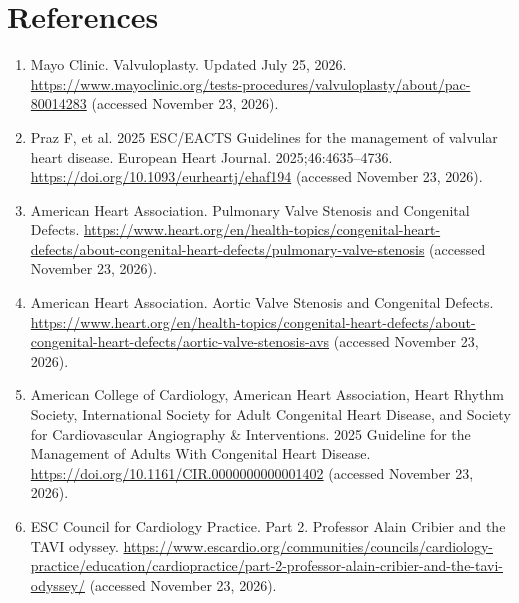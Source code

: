 \section*{References}
\begin{enumerate}
  \item Mayo Clinic. Valvuloplasty. Updated July 25, 2026. \url{https://www.mayoclinic.org/tests-procedures/valvuloplasty/about/pac-80014283} (accessed November 23, 2026).
  \item Praz F, et al. 2025 ESC/EACTS Guidelines for the management of valvular heart disease. European Heart Journal. 2025;46:4635--4736. \url{https://doi.org/10.1093/eurheartj/ehaf194} (accessed November 23, 2026).
  \item American Heart Association. Pulmonary Valve Stenosis and Congenital Defects. \url{https://www.heart.org/en/health-topics/congenital-heart-defects/about-congenital-heart-defects/pulmonary-valve-stenosis} (accessed November 23, 2026).
  \item American Heart Association. Aortic Valve Stenosis and Congenital Defects. \url{https://www.heart.org/en/health-topics/congenital-heart-defects/about-congenital-heart-defects/aortic-valve-stenosis-avs} (accessed November 23, 2026).
  \item American College of Cardiology, American Heart Association, Heart Rhythm Society, International Society for Adult Congenital Heart Disease, and Society for Cardiovascular Angiography \& Interventions. 2025 Guideline for the Management of Adults With Congenital Heart Disease. \url{https://doi.org/10.1161/CIR.0000000000001402} (accessed November 23, 2026).
  \item ESC Council for Cardiology Practice. Part 2. Professor Alain Cribier and the TAVI odyssey. \url{https://www.escardio.org/communities/councils/cardiology-practice/education/cardiopractice/part-2-professor-alain-cribier-and-the-tavi-odyssey/} (accessed November 23, 2026).
\end{enumerate}

\clearpage
